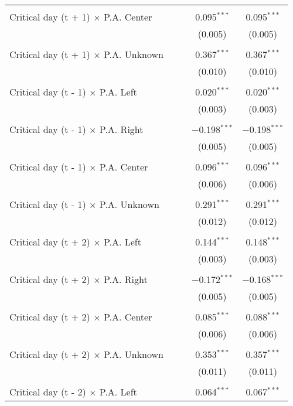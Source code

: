 \documentclass[
]{article}
\begin{document}
\begin{table}[!htbp]
{\begin{tabular}{@{\extracolsep{5pt}}lcccc}
  & & & & \\ 
 Critical day (t + 1) $\times$ P.A. Center &  &  & 0.095$^{***}$ & 0.095$^{***}$ \\ 
  &  &  & (0.005) & (0.005) \\ 
  & & & & \\ 
 Critical day (t + 1) $\times$ P.A. Unknown &  &  & 0.367$^{***}$ & 0.367$^{***}$ \\ 
  &  &  & (0.010) & (0.010) \\ 
  & & & & \\ 
 Critical day (t - 1) $\times$ P.A. Left &  &  & 0.020$^{***}$ & 0.020$^{***}$ \\ 
  &  &  & (0.003) & (0.003) \\ 
  & & & & \\ 
 Critical day (t - 1) $\times$ P.A. Right &  &  & $-$0.198$^{***}$ & $-$0.198$^{***}$ \\ 
  &  &  & (0.005) & (0.005) \\ 
  & & & & \\ 
 Critical day (t - 1) $\times$ P.A. Center &  &  & 0.096$^{***}$ & 0.096$^{***}$ \\ 
  &  &  & (0.006) & (0.006) \\ 
  & & & & \\ 
 Critical day (t - 1) $\times$ P.A. Unknown &  &  & 0.291$^{***}$ & 0.291$^{***}$ \\ 
  &  &  & (0.012) & (0.012) \\ 
  & & & & \\ 
 Critical day (t + 2) $\times$ P.A. Left &  &  & 0.144$^{***}$ & 0.148$^{***}$ \\ 
  &  &  & (0.003) & (0.003) \\ 
  & & & & \\ 
 Critical day (t + 2) $\times$ P.A. Right &  &  & $-$0.172$^{***}$ & $-$0.168$^{***}$ \\ 
  &  &  & (0.005) & (0.005) \\ 
  & & & & \\ 
 Critical day (t + 2) $\times$ P.A. Center &  &  & 0.085$^{***}$ & 0.088$^{***}$ \\ 
  &  &  & (0.006) & (0.006) \\ 
  & & & & \\ 
 Critical day (t + 2) $\times$ P.A. Unknown &  &  & 0.353$^{***}$ & 0.357$^{***}$ \\ 
  &  &  & (0.011) & (0.011) \\ 
  & & & & \\ 
 Critical day (t - 2) $\times$ P.A. Left &  &  & 0.064$^{***}$ & 0.067$^{***}$ \\ 

\end{tabular}}
\end{table}
\end{document}
